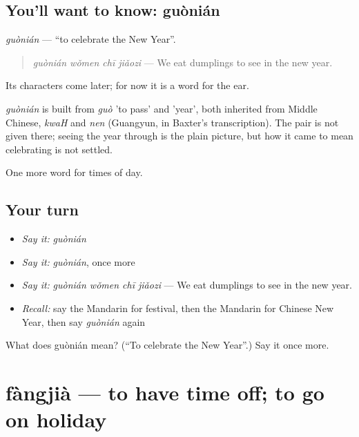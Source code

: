\subsection*{You'll want to know: guònián}
\emph{guònián} — \textquotedblleft{}to celebrate the New Year\textquotedblright{}.

\begin{quote}
\emph{guònián wǒmen chī jiǎozi} — We eat dumplings to see in the new year.
\end{quote}

Its characters come later; for now it is a word for the ear.

\begin{cousinweb}
\emph{guònián} is built from \emph{guò} 'to pass' and  'year', both inherited from Middle Chinese, \emph{kwaH} and \emph{nen} (Guangyun, in Baxter's transcription). The pair is not given there; seeing the year through is the plain picture, but how it came to mean celebrating is not settled.
\end{cousinweb}

\begin{grammarlens}[title={What you've built}]
One more word for times of day.
\end{grammarlens}

\subsection*{Your turn}
\begin{itemize}
\raggedright
  \item \emph{Say it:} \emph{guònián}
  \item \emph{Say it:} \emph{guònián}, once more
  \item \emph{Say it:} \emph{guònián wǒmen chī jiǎozi} — We eat dumplings to see in the new year.
  \item \emph{Recall:} say the Mandarin for festival, then the Mandarin for Chinese New Year, then say \emph{guònián} again
\end{itemize}

\begin{tcolorbox}[breakable,colback=teal!4,colframe=teal!35!black,title={Before you move on}]
What does guònián mean? (\textquotedblleft{}To celebrate the New Year\textquotedblright{}.) Say it once more.
\end{tcolorbox}
\section[fàngjià]{fàngjià — to have time off; to go on holiday}

